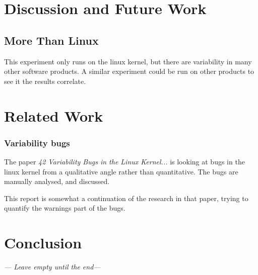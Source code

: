 \documentclass[a4paper,11pt]{report}
\begin{document}


            \newpage
            \chapter{Discussion and Future Work}

            \section{More Than Linux}

This experiment only runs on the linux kernel, but there are variability in many
other software products. A similar experiment could be run on other products to 
see it the results correlate.



            \newpage
            \chapter{Related Work}

            \subsection*{Variability bugs}
The paper \emph{42 Variability Bugs in the Linux Kernel...}\cite{42bugs} is 
looking at bugs in the linux kernel from a qualitative angle rather than 
quantitative.  The bugs are manually analysed, and discussed.

This report is somewhat a continuation of the research in that paper, trying to 
quantify the warnings part of the bugs.

\newpage
\chapter{Conclusion}
\emph{--- Leave empty until the end---}
\end{document}
